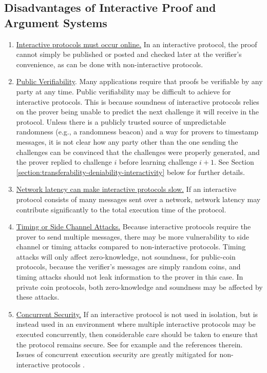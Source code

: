 \subsection{Disadvantages of Interactive Proof and Argument Systems}
\label{disadvantagesofinteraction}
\begin{enumerate}

\item \underline{Interactive protocols must occur online.} In an interactive protocol, the proof cannot simply be published or posted and checked later at the verifier's convenience, as can be done with non-interactive protocols.

\item \underline{Public Verifiability}. Many applications require that proofs be verifiable by any party at any time. 
Public verifiability
may be difficult to achieve for interactive protocols. This is because soundness of interactive 
protocols relies on the prover being unable to predict the next challenge it will receive in the protocol. Unless there is a publicly trusted source of unpredictable
randomness (e.g., a randomness beacon) and a way for provers to timestamp messages, it is not clear how any party other than
the one sending the challenges can be convinced that the challenges were properly generated, and the prover replied to challenge $i$ before learning challenge $i+1$.
See Section \ref{section:transferability-deniability-interactivity} below for further details.

\item \underline{Network latency can make interactive protocols slow.} If an interactive protocol consists of many messages sent over a network,
network latency may contribute significantly to the total execution time of the protocol.

\item \underline{Timing or Side Channel Attacks.} Because interactive protocols require the prover to send multiple messages, there may be more vulnerability to side channel or timing attacks compared to non-interactive protocols. Timing attacks will only affect zero-knowledge, not soundness, for public-coin protocols, because the verifier's messages are simply random coins, and timing attacks should not leak information to the prover in this case. In private coin protocols, both zero-knowledge and soundness may be affected by these attacks.

\item \underline{Concurrent Security.}  If an interactive protocol is not used in isolation, but is instead used in an environment where multiple interactive
protocols may be executed concurrently, then considerable care should be taken to ensure that the protocol remains secure. 
 See for example \cite[Section 2.1]{2013:CISS:a-short-tutorial-on-zero-knowledge}
and the references therein. Issues of concurrent execution security
are greatly mitigated for non-interactive protocols \cite{2006:eurocrypt:perfect-NIZK-for-NP}. 


\end{enumerate}
